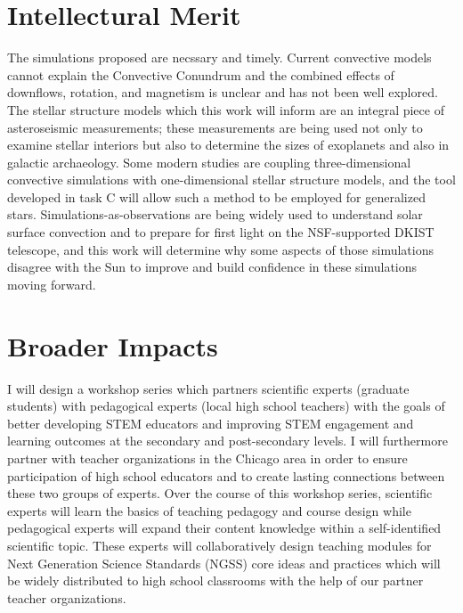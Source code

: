 \documentclass[aasms,11pt]{article}
\begin{document}
\section{Intellectural Merit}
\vspace{-11pt}
The simulations proposed are necssary and timely. 
Current convective models cannot explain the Convective Conundrum and the combined effects of downflows, rotation, and magnetism is unclear and has not been well explored. 
The stellar structure models which this work will inform are an integral piece of asteroseismic measurements; these measurements are being used not only to examine stellar interiors but also to determine the sizes of exoplanets and also in galactic archaeology.
Some modern studies are coupling three-dimensional convective simulations with one-dimensional stellar structure models, and the tool developed in task C will allow such a method to be employed for generalized stars.
Simulations-as-observations are being widely used to understand solar surface convection and to prepare for first light on the NSF-supported DKIST telescope, and this work will determine why some aspects of those simulations disagree with the Sun to improve and build confidence in these simulations moving forward.


\vspace{-7pt}
\section{Broader Impacts}
\vspace{-11pt}
I will design a workshop series which partners scientific experts (graduate students) with pedagogical experts (local high school teachers) with the goals of better developing STEM educators and improving STEM engagement and learning outcomes at the secondary and post-secondary levels.
I will furthermore partner with teacher organizations in the Chicago area in order to ensure participation of high school educators and to create lasting connections between these two groups of experts.
Over the course of this workshop series, scientific experts will learn the basics of teaching pedagogy and course design while pedagogical experts will expand their content knowledge within a self-identified scientific topic.
These experts will collaboratively design teaching modules for Next Generation Science Standards (NGSS) core ideas and practices which will be widely distributed to high school classrooms with the help of our partner teacher organizations.
\end{document}
